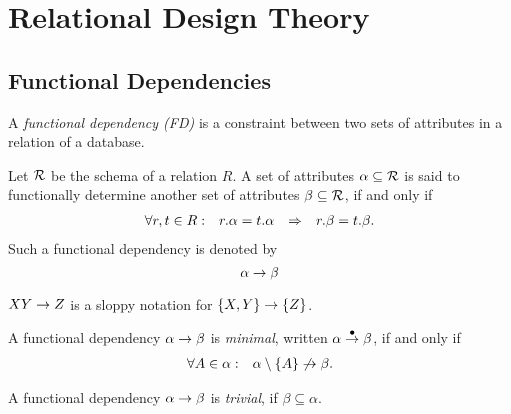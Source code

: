 

\section{Relational Design Theory}




\subsection{Functional Dependencies}

A \emph{functional dependency (FD)} is a constraint between two sets of attributes in a relation of a database.

Let $\mathcal{R}$ be the schema of a relation $R$. A set of attributes \mbox{$\alpha \subseteq \mathcal{R}$} is said to functionally determine another set of attributes $\beta \subseteq \mathcal{R}$, if and only if
\[ \begin{array}{cccc}
\forall r,t \in R: &
r.\alpha = t.\alpha
& \Rightarrow &
r.\beta = t.\beta.
\end{array}\]
Such a functional dependency is denoted by
\[ \alpha \rightarrow \beta \]

\begin{note}
 $XY \rightarrow Z$ is a sloppy notation for $\{X,Y\}\rightarrow\{Z\}$.
\end{note}

A functional dependency $\alpha \rightarrow \beta$ is \emph{minimal}, written \mbox{$\alpha \overset{\bullet}{\rightarrow} \beta$}, if and only if
\[ \begin{array}{cc}
\forall A \in \alpha: & \alpha\setminus\{A\} \not\rightarrow \beta.
\end{array} \]

A functional dependency $\alpha \rightarrow \beta$ is \emph{trivial}, if $\beta \subseteq \alpha$.




